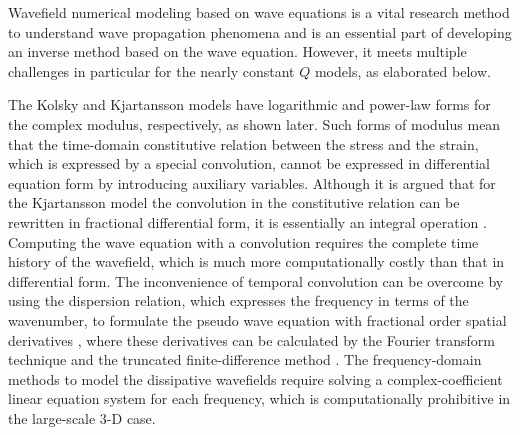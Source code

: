 \documentclass[article]{./macros/elsarticle_qh}
\begin{document}
Wavefield numerical modeling based on wave equations is a vital research method to understand wave propagation phenomena and is an essential part of developing an inverse method based on the wave equation. However, it meets multiple challenges in particular for the nearly constant $Q$ models, as elaborated below. 

The Kolsky and Kjartansson models have logarithmic and power-law forms for the complex modulus, respectively, as shown later. Such forms of modulus mean that the time-domain constitutive relation between the stress and the strain, which is expressed by a special convolution, cannot be expressed in differential equation form by introducing auxiliary variables. Although it is argued that for the Kjartansson model the convolution in the constitutive relation can be rewritten in fractional differential form, it is essentially an integral operation  \cite[]{kjartansson:1979,carcione.cavallini:2002,carcione:2010}. Computing the wave equation with a convolution requires the complete time history of the wavefield, which is much more computationally costly than that in differential form. The inconvenience of temporal convolution can be overcome by using the dispersion relation, which expresses the frequency in terms of the wavenumber, to formulate the pseudo wave equation with fractional order spatial derivatives \citep[]{carcione:2010,carcione:2014}, where these derivatives can be calculated by the Fourier transform technique \citep[e.g.,][]{carcione:2010,zhu:2014} and the truncated finite-difference method \cite[]{song:2020}. 
The frequency-domain methods \citep[e.g.,][]{stekl:1998,operto:2009} to model the dissipative wavefields require solving a complex-coefficient linear equation system for each frequency, which is computationally prohibitive in the large-scale 3-D case. 
\end{document}
